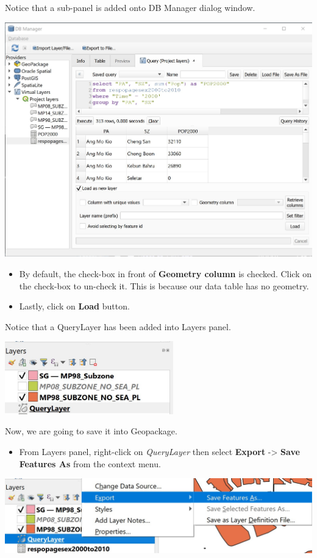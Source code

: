 \documentclass[
  letterpaper,
  DIV=11,
  numbers=noendperiod]{scrreprt}
\providecommand{\tightlist}{%
  \setlength{\itemsep}{0pt}\setlength{\parskip}{0pt}}\usepackage{longtable,booktabs,array}
\begin{document}
Notice that a sub-panel is added onto DB Manager dialog window.

\includegraphics{./img03/image48.jpg}

\begin{itemize}
\item
  By default, the check-box in front of \textbf{Geometry column} is
  checked. Click on the check-box to un-check it. This is because our
  data table has no geometry.
\item
  Lastly, click on \textbf{Load} button.
\end{itemize}

Notice that a QueryLayer has been added into Layers panel.

\includegraphics[width=2.875in,height=\textheight]{./img03/image50.jpg}

Now, we are going to save it into Geopackage.

\begin{itemize}
\tightlist
\item
  From Layers panel, right-click on \emph{QueryLayer} then select
  \textbf{Export} -\textgreater{} \textbf{Save Features As} from the
  context menu.
\end{itemize}

\includegraphics{./img03/image51.jpg}
\end{document}

